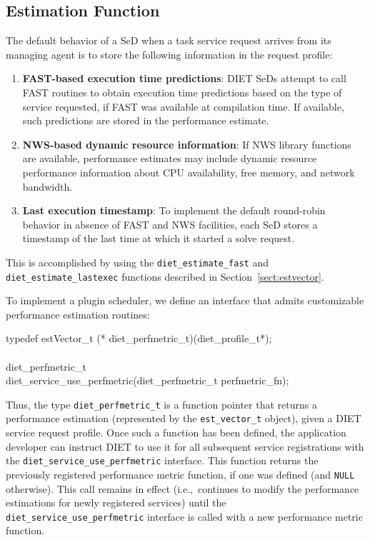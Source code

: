 \subsection{Estimation Function}\label{sect:est_fn}

The default behavior of a SeD when a task service request arrives from
its managing agent is to store the following information in the
request profile:
\begin{enumerate}
\item \textbf{FAST-based execution time predictions}: DIET SeDs
  attempt to call FAST
  routines to obtain execution time predictions based on the type of
  service requested, if FAST was available at compilation time.  If
  available, such predictions are stored in the
  performance estimate.
\item \textbf{NWS-based dynamic resource information}: If NWS library
  functions are available, performance estimates may include dynamic
  resource performance information about CPU availability, free
  memory, and network bandwidth.
\item \textbf{Last execution timestamp}: To implement the default
  round-robin behavior in absence of FAST and NWS facilities, each SeD
  stores a timestamp of the last time at which it started a solve
  request.
\end{enumerate}
This is accomplished by using the \texttt{diet\_estimate\_fast} and
\texttt{diet\_estimate\_lastexec} functions described in
Section~\ref{sect:estvector}.

To implement a plugin scheduler, we define an
interface that admits customizable performance estimation routines:
\begin{code}
  typedef estVector\_t (* diet\_perfmetric\_t)(diet\_profile\_t*);\\
  \\
  diet\_perfmetric\_t\\
  diet\_service\_use\_perfmetric(diet\_perfmetric\_t perfmetric\_fn);\\
\end{code}
Thus, the type \texttt{diet\_perfmetric\_t} is a function pointer
that returns a performance estimation (represented by the
\texttt{est\_vector\_t} object), given a DIET service request
profile.  Once such a function has been defined, the application
developer can instruct DIET to use it for all subsequent service
registrations with the
\texttt{diet\_service\_use\_perfmetric} interface.  This function
returns the previously registered performance metric function, if one
was defined (and
\texttt{NULL} otherwise).  This call remains in effect
(i.e.,~continues to modify the performance estimations for newly
registered services) until the
\texttt{diet\_service\_use\_perfmetric} interface is called with a new
performance metric function.

